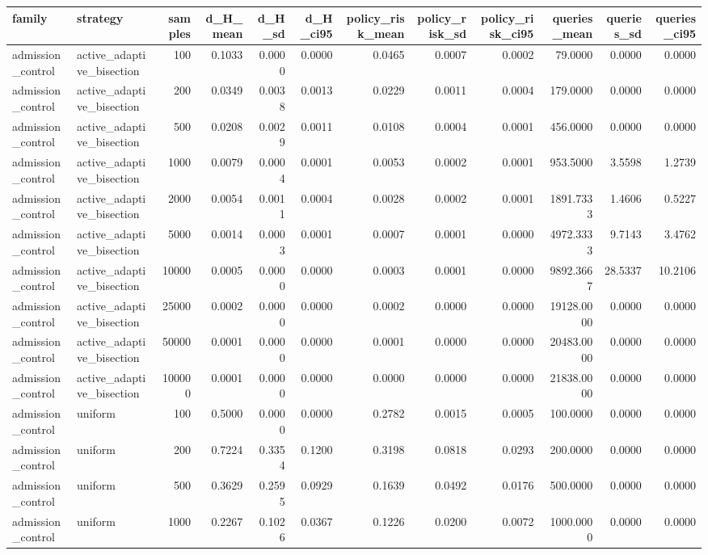 \begin{tabular}{llrrrrrrrrrr}
\toprule
family & strategy & samples & d_H_mean & d_H_sd & d_H_ci95 & policy_risk_mean & policy_risk_sd & policy_risk_ci95 & queries_mean & queries_sd & queries_ci95 \\
\midrule
admission_control & active_adaptive_bisection & 100 & 0.1033 & 0.0000 & 0.0000 & 0.0465 & 0.0007 & 0.0002 & 79.0000 & 0.0000 & 0.0000 \\
admission_control & active_adaptive_bisection & 200 & 0.0349 & 0.0038 & 0.0013 & 0.0229 & 0.0011 & 0.0004 & 179.0000 & 0.0000 & 0.0000 \\
admission_control & active_adaptive_bisection & 500 & 0.0208 & 0.0029 & 0.0011 & 0.0108 & 0.0004 & 0.0001 & 456.0000 & 0.0000 & 0.0000 \\
admission_control & active_adaptive_bisection & 1000 & 0.0079 & 0.0004 & 0.0001 & 0.0053 & 0.0002 & 0.0001 & 953.5000 & 3.5598 & 1.2739 \\
admission_control & active_adaptive_bisection & 2000 & 0.0054 & 0.0011 & 0.0004 & 0.0028 & 0.0002 & 0.0001 & 1891.7333 & 1.4606 & 0.5227 \\
admission_control & active_adaptive_bisection & 5000 & 0.0014 & 0.0003 & 0.0001 & 0.0007 & 0.0001 & 0.0000 & 4972.3333 & 9.7143 & 3.4762 \\
admission_control & active_adaptive_bisection & 10000 & 0.0005 & 0.0000 & 0.0000 & 0.0003 & 0.0001 & 0.0000 & 9892.3667 & 28.5337 & 10.2106 \\
admission_control & active_adaptive_bisection & 25000 & 0.0002 & 0.0000 & 0.0000 & 0.0002 & 0.0000 & 0.0000 & 19128.0000 & 0.0000 & 0.0000 \\
admission_control & active_adaptive_bisection & 50000 & 0.0001 & 0.0000 & 0.0000 & 0.0001 & 0.0000 & 0.0000 & 20483.0000 & 0.0000 & 0.0000 \\
admission_control & active_adaptive_bisection & 100000 & 0.0001 & 0.0000 & 0.0000 & 0.0000 & 0.0000 & 0.0000 & 21838.0000 & 0.0000 & 0.0000 \\
admission_control & uniform & 100 & 0.5000 & 0.0000 & 0.0000 & 0.2782 & 0.0015 & 0.0005 & 100.0000 & 0.0000 & 0.0000 \\
admission_control & uniform & 200 & 0.7224 & 0.3354 & 0.1200 & 0.3198 & 0.0818 & 0.0293 & 200.0000 & 0.0000 & 0.0000 \\
admission_control & uniform & 500 & 0.3629 & 0.2595 & 0.0929 & 0.1639 & 0.0492 & 0.0176 & 500.0000 & 0.0000 & 0.0000 \\
admission_control & uniform & 1000 & 0.2267 & 0.1026 & 0.0367 & 0.1226 & 0.0200 & 0.0072 & 1000.0000 & 0.0000 & 0.0000 \\

\end{tabular}
